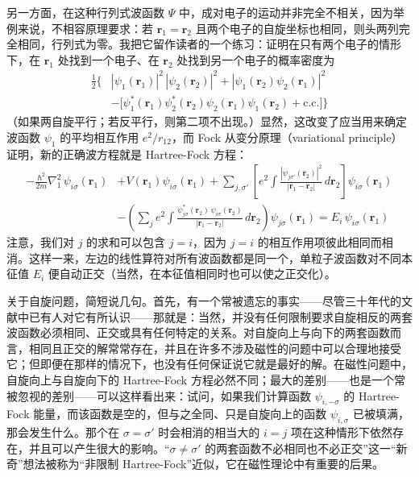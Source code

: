 另一方面，在这种行列式波函数 $\Psi$ 中，成对电子的运动并非完全不相关，因为举例来说，不相容原理要求：若 $\mathbf{r}_1=\mathbf{r}_2$ 且两个电子的自旋坐标也相同，则头两列完全相同，行列式为零。我把它留作读者的一个练习：证明在只有两个电子的情形下，在 $\mathbf{r}_1$ 处找到一个电子、在 $\mathbf{r}_2$ 处找到另一个电子的概率密度为
\begin{align*}
\frac{1}{2}\Big\{&|\psi_1(\mathbf{r}_1)|^2\,|\psi_2(\mathbf{r}_2)|^2+|\psi_1(\mathbf{r}_2)\psi_2(\mathbf{r}_1)|^2\\
&-\big[\psi_1^*(\mathbf{r}_1)\psi_2^*(\mathbf{r}_2)\psi_2(\mathbf{r}_1)\psi_1(\mathbf{r}_2)+\text{c.c.}\big]\Big\}
\end{align*}
（如果两自旋平行；若反平行，则第二项不出现。）显然，这改变了应当用来确定波函数 $\psi_1$ 的平均相互作用 $e^2/r_{12}$，而 Fock 从变分原理（variational principle）证明，新的正确波方程就是 Hartree-Fock 方程：
\begin{align*}
-\frac{\hbar^2}{2m}\nabla_1^2\,\psi_{i\sigma}(\mathbf{r}_1)&+V(\mathbf{r}_1)\psi_{i\sigma}(\mathbf{r}_1)+\sum_{j,\sigma'}\left[e^2\int\frac{|\psi_{j\sigma'}(\mathbf{r}_2)|^2}{|\mathbf{r}_1-\mathbf{r}_2|}\,d\mathbf{r}_2\right]\psi_{i\sigma}(\mathbf{r}_1)\\
&-\left(\sum_j e^2\int\frac{\psi_{j\sigma}^*(\mathbf{r}_2)\,\psi_{i\sigma}(\mathbf{r}_2)}{|\mathbf{r}_1-\mathbf{r}_2|}\,d\mathbf{r}_2\right)\psi_{j\sigma}(\mathbf{r}_1)=E_i\,\psi_{i\sigma}(\mathbf{r}_1)
\end{align*}
注意，我们对 $j$ 的求和可以包含 $j=i$，因为 $j=i$ 的相互作用项彼此相同而相消。这样一来，左边的线性算符对所有波函数都是同一个，单粒子波函数对不同本征值 $E_i$ 便自动正交（当然，在本征值相同时也可以使之正交化）。

关于自旋问题，简短说几句。首先，有一个常被遗忘的事实——尽管三十年代的文献中已有人对它有所认识——那就是：当然，并没有任何限制要求自旋相反的两套波函数必须相同、正交或具有任何特定的关系。对自旋向上与向下的两套函数而言，相同且正交的解常常存在，并且在许多不涉及磁性的问题中可以合理地接受它；但即便在那样的情况下，也没有任何保证说它就是最好的解。在磁性问题中，自旋向上与自旋向下的 Hartree-Fock 方程必然不同；最大的差别——也是一个常被忽视的差别——可以这样看出来：试问，如果我们计算函数 $\psi_{i,-\sigma}$ 的 Hartree-Fock 能量，而该函数是空的，但与之全同、只是自旋向上的函数 $\psi_{i,\sigma}$ 已被填满，那会发生什么。那个在 $\sigma=\sigma'$ 时会相消的相当大的 $i=j$ 项在这种情形下依然存在，并且可以产生很大的影响。“$\sigma\neq\sigma'$ 的两套函数不必相同也不必正交”这一“新奇”想法被称为“非限制 Hartree-Fock”近似，它在磁性理论中有重要的后果。

